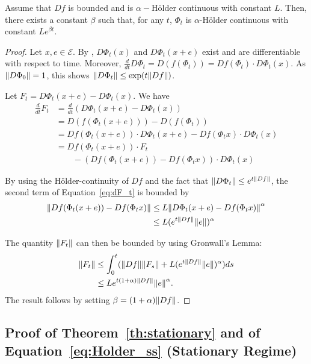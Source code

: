 \documentclass[sigconf]{acmart}
\newcommand\E{\mathcal{E}}
\newcommand\norm[1]{{\mathchoice{\bnorm{#1}}{\snorm{#1}}{\snorm{#1}}{\snorm{#1}}}}
\newcommand\bnorm[1]{\left\|#1\right\|}
\newcommand\snorm[1]{\|#1\|}
\newcommand\dt{\frac{d}{dt}}
\newcommand\p[1]{\left(#1\right)}
\begin{document}
\begin{lemma}
  \label{lem:Holder}
  Assume that $Df$ is bounded and is $\alpha-$Hölder continuous with
  constant $L$. Then, there exists a constant $\beta$ such that, for
  any $t$, $\Phi_t$ is $\alpha$-Hölder continuous with constant
  $Le^{\beta t}$.
\end{lemma}
\begin{proof}
  Let $x,e\in\E$. By \cite[Theorem~3.7.1 of Part~II]{cartan1977cours},
  $D\Phi_t(x)$ and $D\Phi_t(x+e)$ exist and are differentiable with
  respect to time. Moreover,
  $\dt D\Phi_t=D(f(\Phi_t))=Df(\Phi_t)\cdot D\Phi_t(x)$. As
  $\norm{D\Phi_0}=1$, this shows $\norm{D\Phi_t}\le\exp(t\norm{Df})$.

  Let $F_t=D\Phi_t(x+e)-D\Phi_t(x)$. We have
  \begin{align}
    \dt F_t &= \dt \p{D\Phi_t(x+e)-D\Phi_t(x)}\nonumber\\
            &= D(f(\Phi_t(x+e))) - D(f(\Phi_t))\nonumber\\
            &= Df (\Phi_t(x+e))\cdot D\Phi_t(x+e) - Df(\Phi_tx)\cdot
              D\Phi_t(x)\nonumber\\
            &= Df (\Phi_t(x+e))\cdot F_t \nonumber\\
            &\qquad -\p{Df(\Phi_t(x+e))-Df(\Phi_tx)}\cdot D\Phi_t(x)
              \label{eq:dF_t}
  \end{align}
  
  By using the Hölder-continuity of $Df$ and the fact that
  $\norm{D\Phi_t}\le e^{t\norm{Df}}$, the second term of
  Equation~\eqref{eq:dF_t} is bounded by
  \begin{align*}
    \norm{Df(\Phi_t(x+e))-Df(\Phi_tx)}
    &\le L\norm{D\Phi_t(x+e)-Df(\Phi_tx)}^\alpha\\
    &\le L(e^{t\norm{Df}}\norm{e})^\alpha 
  \end{align*}

  The quantity $\norm{F_t}$ can then be bounded by using Gronwall's
  Lemma:
  \begin{align*}
    \norm{F_t}&\le \int_0^t(\norm{Df} \norm{F_s} +
    L(e^{t\norm{Df}}\norm{e})^\alpha)ds \\
              &\le L e^{t(1+\alpha)\norm{Df}}\norm{e}^\alpha.
  \end{align*}
  The result follows by setting $\beta=(1+\alpha)\norm{Df}$.
\end{proof}



\subsection{Proof of Theorem~\ref{th:stationary} and of
  Equation~\eqref{eq:Holder_ss} (Stationary Regime)}
\label{sec:proof_ss}
\end{document}
